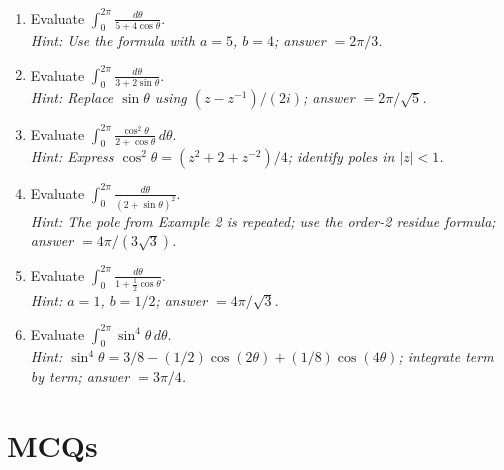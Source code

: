 \documentclass[12pt,a4paper]{article}
\begin{document}
\begin{enumerate}
  \item Evaluate $\displaystyle\int_0^{2\pi}\frac{d\theta}{5+4\cos\theta}$.\\
        \textit{Hint: Use the formula with $a=5$, $b=4$; answer $= 2\pi/3$.}

  \item Evaluate $\displaystyle\int_0^{2\pi}\frac{d\theta}{3+2\sin\theta}$.\\
        \textit{Hint: Replace $\sin\theta$ using $(z-z^{-1})/(2i)$; answer $= 2\pi/\sqrt{5}$.}

  \item Evaluate $\displaystyle\int_0^{2\pi}\frac{\cos^2\theta}{2+\cos\theta}\,d\theta$.\\
        \textit{Hint: Express $\cos^2\theta = (z^2+2+z^{-2})/4$; identify poles in $|z|<1$.}

  \item Evaluate $\displaystyle\int_0^{2\pi}\frac{d\theta}{(2+\sin\theta)^2}$.\\
        \textit{Hint: The pole from Example 2 is repeated; use the order-2 residue formula; answer $= 4\pi/(3\sqrt{3})$.}

  \item Evaluate $\displaystyle\int_0^{2\pi}\frac{d\theta}{1+\frac{1}{2}\cos\theta}$.\\
        \textit{Hint: $a=1$, $b=1/2$; answer $= 4\pi/\sqrt{3}$.}

  \item Evaluate $\displaystyle\int_0^{2\pi}\sin^4\theta\,d\theta$.\\
        \textit{Hint: $\sin^4\theta = 3/8 - (1/2)\cos(2\theta) + (1/8)\cos(4\theta)$;
        integrate term by term; answer $= 3\pi/4$.}
\end{enumerate}

\section{MCQs}
\end{document}
